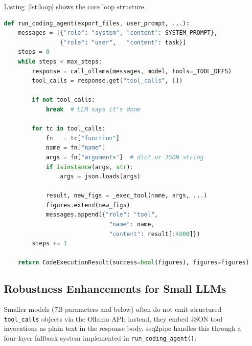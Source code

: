 \documentclass[12pt, a4paper]{article}
\begin{document}
Listing~\ref{lst:loop} shows the core loop structure.

\begin{lstlisting}[language=Python, caption={Core tool-calling loop in run\_coding\_agent()}, label={lst:loop}]
def run_coding_agent(export_files, user_prompt, ...):
    messages = [{"role": "system", "content": SYSTEM_PROMPT},
                {"role": "user",   "content": task}]
    steps = 0
    while steps < max_steps:
        response = call_ollama(messages, model, tools=_TOOL_DEFS)
        tool_calls = response.get("tool_calls", [])

        if not tool_calls:
            break  # LLM says it's done

        for tc in tool_calls:
            fn   = tc["function"]
            name = fn["name"]
            args = fn["arguments"]  # dict or JSON string
            if isinstance(args, str):
                args = json.loads(args)

            result, new_figs = _exec_tool(name, args, ...)
            figures.extend(new_figs)
            messages.append({"role": "tool",
                              "name": name,
                              "content": result[:4000]})
        steps += 1

    return CodeExecutionResult(success=bool(figures), figures=figures)
\end{lstlisting}

\subsection{Robustness Enhancements for Small LLMs}

Smaller models (7B parameters and below) often do not emit structured
\texttt{tool\_calls} objects via the Ollama API; instead, they embed
JSON tool invocations as plain text in the response body.
seq2pipe handles this through a four-layer fallback system implemented
in \texttt{run\_coding\_agent()}:
\end{document}
